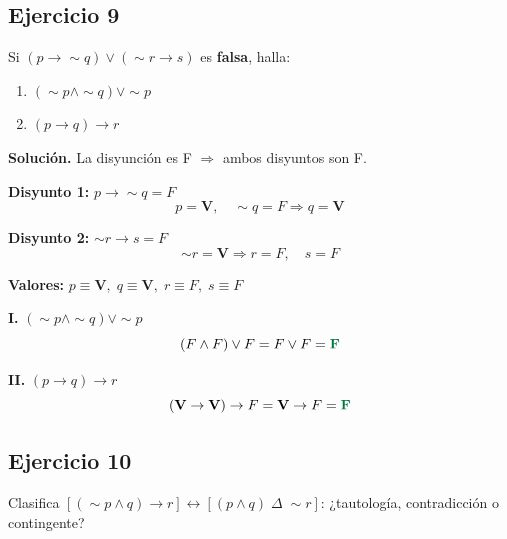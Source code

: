 \documentclass[12pt,a4paper]{article}
\newcommand{\V}{\textbf{V}}
\newcommand{\F}{F}
\newcommand{\resultado}[1]{\textcolor{verde}{\textbf{#1}}}
\begin{document}
\bigskip

\subsection*{Ejercicio 9}

\begin{enunciado}
Si $(p \rightarrow \sim q) \vee (\sim r \rightarrow s)$ es \textbf{falsa}, halla:
\begin{enumerate}[label=\Roman*.]
  \item $(\sim p \wedge \sim q) \vee \sim p$
  \item $(p \rightarrow q) \rightarrow r$
\end{enumerate}
\end{enunciado}

\begin{solucion}
\textbf{Solución.} La disyunción es F $\Rightarrow$ ambos disyuntos son F.

\textbf{Disyunto 1:} $p \rightarrow \sim q = \F$
\[
p = \V,\quad \sim q = \F \Rightarrow q = \V
\]

\textbf{Disyunto 2:} $\sim r \rightarrow s = \F$
\[
\sim r = \V \Rightarrow r = \F,\quad s = \F
\]

\textbf{Valores:} $p \equiv \V,\; q \equiv \V,\; r \equiv \F,\; s \equiv \F$

\medskip
\textbf{I.} $(\sim p \wedge \sim q) \vee \sim p$
\[
(\F \wedge \F) \vee \F = \F \vee \F = \resultado{F}
\]

\textbf{II.} $(p \rightarrow q) \rightarrow r$
\[
(\V \rightarrow \V) \rightarrow \F = \V \rightarrow \F = \resultado{F}
\]
\end{solucion}

\newpage

\subsection*{Ejercicio 10}

\begin{enunciado}
Clasifica $[(\sim p \wedge q) \rightarrow r] \leftrightarrow [(p \wedge q) \;\Delta\; \sim r]$: ¿tautología, contradicción o contingente?
\end{enunciado}
\end{document}
